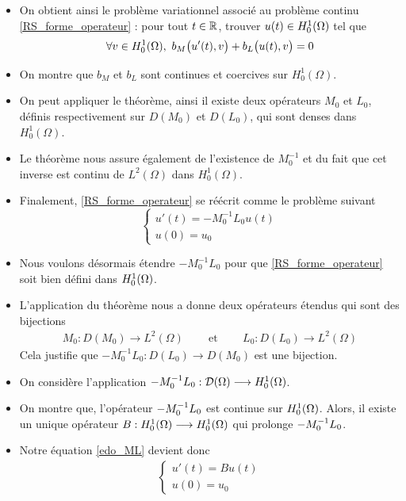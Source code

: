 \begin{frame}
    \begin{itemize}
\item On obtient ainsi le problème variationnel associé au problème continu \eqref{RS_forme_operateur} : pour tout $t \in \mathbb{R}$, trouver $u(t) \in H^1_0(\Omega)$ tel que
\begin{equation*}
    \forall v \in H^1_0(\Omega), \ b_M\big(u'(t),v\big) + b_L\big(u(t),v\big) = 0
\end{equation*}
    \item On montre que $b_M$ et $b_L$ sont continues et coercives sur $H^1_0(\Omega)$. 
    \item On peut appliquer le théorème, ainsi il existe deux opérateurs $M_0$ et 
    $L_0$, définis respectivement sur $D(M_0)$ et $D(L_0)$, qui sont denses dans $H^1_0(\Omega)$. 
    \item Le théorème nous assure également de l'existence de $M^{-1}_0$ et 
du fait que cet inverse est continu de $L^2(\Omega)$ dans 
$H^1_0(\Omega)$. 
\item Finalement, \eqref{RS_forme_operateur} se 
réécrit comme le problème suivant
\begin{equation}\label{edo_ML}
\begin{cases}
    u'(t) = -M^{-1}_0 L_0u(t)  \\
    u(0) = u_0
\end{cases}
\end{equation}
\end{itemize}
\end{frame}

\begin{frame}
    \begin{itemize}
        \item Nous voulons désormais étendre $-M^{-1}_0 L_0$ pour que \eqref{RS_forme_operateur} soit bien défini dans $H^1_0(\Omega)$. 
        \item L'application du théorème nous a donne deux opérateurs étendus qui sont des bijections
\begin{eqnarray*}
    M_0 : D(M_0) \longrightarrow L^2(\Omega) \ \ \ \ \ &\text{ et }& \ \ \ \ \ L_0 : D(L_0) \longrightarrow L^2(\Omega)
\end{eqnarray*}
Cela justifie que  $-M^{-1}_0L_0 : D(L_0)\longrightarrow D(M_0)$ est une bijection. 
\item On considère l'application $-M^{-1}_0L_0 : \mathcal{D}(\Omega)
\longrightarrow H^1_0(\Omega)$. 
\item On montre que, l'opérateur $-M^{-1}_0 L_0$ est continue sur 
$H^1_0(\Omega)$. Alors, il existe un unique opérateur 
$B : H^1_0(\Omega) \longrightarrow H^1_0(\Omega)$ qui prolonge $-M^{-1}_0 L_0$. 
    \item Notre équation \eqref{edo_ML} devient donc
\begin{eqnarray}\label{edo_ML_B}
\begin{cases}
    u'(t) = Bu(t)  \\
    u(0) = u_0
\end{cases}
\end{eqnarray}
\end{itemize} 
\end{frame}

